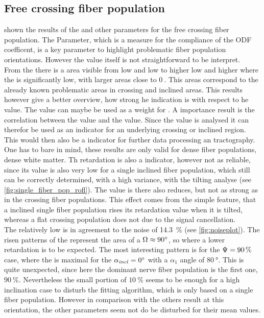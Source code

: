 \subsection{Free crossing fiber population}
 shown the results of the \acc{} and other parameters for the free crossing fiber population.
The \acc{} Parameter, which is a measure for the compliance of the \ac{ODF} coefficent, is a key parameter to highlight problematic fiber population orientations.
However the value itself is not straightforward to be interpret.
\\
From the  there is a area visible from low \modelPsi{} and low \modelInc{} to higher low \modelPsi{} and higher \modelInc{} where the \acc{} is significantly low, with larger areas close to $\SI{0}{}$.
This areas correspond to the already known problematic areas in crossing and inclined areas. 
This results however give a better overview, how strong he indication is with respect to he \acc{} value.
The \acc{} value can maybe be used as a weight for \dummy[not ...]{}.
A importance result is the correlation between the \acc{} value and the \trel{} value.
Since the \trel{} value is analysed it can therefor be used as an indicator for an underlying crossing or inclined region.
This would then also be a indicator for further data processing \eg{} an tractography.
One has to bare in mind, these results are only valid for dense fiber populations, \ie{} dense white matter.
% 
Th retardation is also a indicator, however not as reliable, since its value is also very low for a single inclined fiber population, which still can be correctly determined, with a high variance, with the tilting analyse (see \cref{fig:single_fiber_pop_rofl}).
The \trel{} value is there also reduces, but not as strong as in the crossing fiber populations.
This effect comes from the simple feature, that a inclined single fiber population rises its retardation value when it is tilted, whereas a flat crossing population does not due to the signal cancellation.
\\
% 
The relatively low \rvalue{} is in agreement to the noise of \SI{14,3}{\percent} (see \cref{fig:noiseplot}).
The risen patterns of the \rvalue{} represent the area of a $\textnormal{$\Omega$} \approx \SI{90}{\degree}$, so where a lower retardation is to be expected.
The most interesting pattern is for the $\textnormal{$\Psi$} = \SI{90}{\percent}$ case, where the \rvalue{} is maximal for the $\textnormal{$\alpha_{\mathit{incl}}$} = \SI{0}{\degree}$ with a $\alpha_1$  angle of $\SI{80}{\degree}$.
This is quite unexpected, since here the dominant nerve fiber population is the first one, \ie{} $\SI{90}{\percent}$.
Nevertheless the small portion of $\SI{10}{\percent}$ seems to be enough for a high inclination case to disturb the fitting algorithm, which is only based on a single fiber population.
However in comparison with the others result at this orientation, the other parameters seem not do be disturbed for their mean values.
% 
% 
% 

